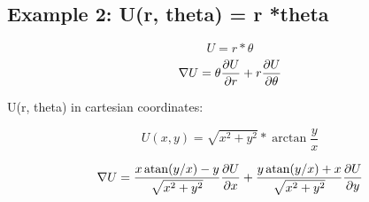 \documentclass{article}
\begin{document}
\subsection{Example 2: U(r, theta) = r *theta}

\[U = r * \theta\]
\[\nabla U = \theta \pdv{U}{r}+ r \pdv{U}{\theta} \]

U(r, theta) in cartesian coordinates:

\[ U(x, y) =\sqrt{x^2 +y^2}
*
\arctan\frac{y}{x} \]

\begin{equation}
\nabla U =
\frac{x \atan(y/x) - y}{\sqrt{x^2 + y^2}}
\pdv{U}{x} 
+
\frac{y \atan(y/x) + x}{\sqrt{x^2 + y^2}}
\pdv{U}{y} 
\end{equation}
\end{document}
